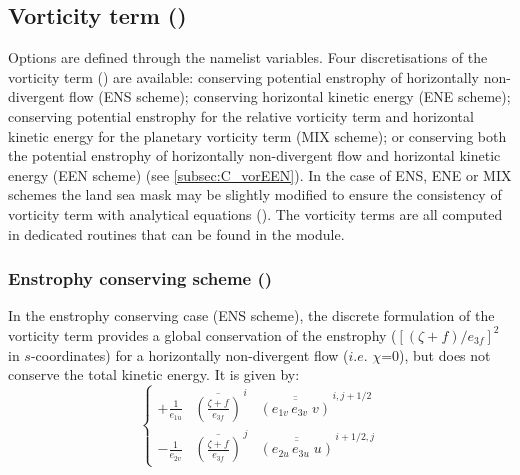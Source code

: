 \documentclass[../tex_main/NEMO_manual]{subfiles}
\begin{document}
\subsection{Vorticity term (\protect{})}
\label{subsec:DYN_vor}


Options are defined through the  namelist variables.
Four discretisations of the vorticity term () are available:
conserving potential enstrophy of horizontally non-divergent flow (ENS scheme);
conserving horizontal kinetic energy (ENE scheme);
conserving potential enstrophy for the relative vorticity term and
horizontal kinetic energy for the planetary vorticity term (MIX scheme);
or conserving both the potential enstrophy of horizontally non-divergent flow and horizontal kinetic energy
(EEN scheme) (see \autoref{subsec:C_vorEEN}).
In the case of ENS, ENE or MIX schemes the land sea mask may be slightly modified to ensure the consistency of
vorticity term with analytical equations ().
The vorticity terms are all computed in dedicated routines that can be found in the  module.

\subsubsection{Enstrophy conserving scheme (\protect{})}
\label{subsec:DYN_vor_ens}

In the enstrophy conserving case (ENS scheme),
the discrete formulation of the vorticity term provides a global conservation of the enstrophy
($ [ (\zeta +f ) / e_{3f} ]^2 $ in $s$-coordinates) for a horizontally non-divergent flow ($i.e.$ $\chi$=$0$),
but does not conserve the total kinetic energy.
It is given by:
\begin{equation} \label{eq:dynvor_ens}
\left\{ 
\begin{aligned}
{+\frac{1}{e_{1u} } } & {\overline {\left( { \frac{\zeta +f}{e_{3f} }} \right)} }^{\,i} 
                                & {\overline{\overline {\left( {e_{1v}\,e_{3v}\;v} \right)}} }^{\,i, j+1/2}    \\
{- \frac{1}{e_{2v} } } & {\overline {\left( {\frac{\zeta +f}{e_{3f} }} \right)} }^{\,j}  
                                & {\overline{\overline {\left( {e_{2u}\,e_{3u}\;u} \right)}} }^{\,i+1/2, j}  
\end{aligned} 
 \right.
\end{equation} 
\end{document}
